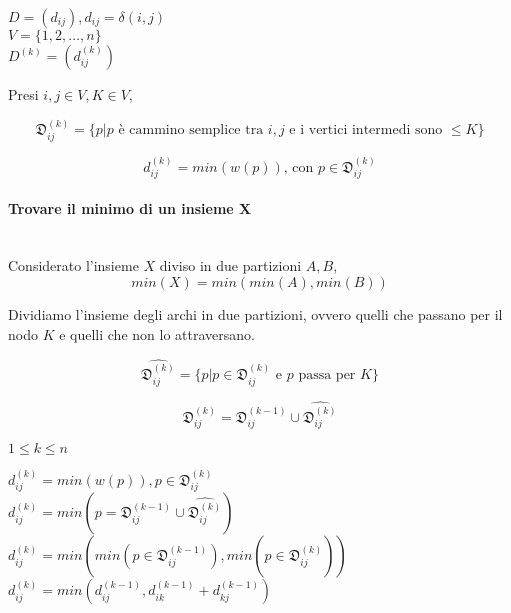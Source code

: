 $D=(d_{ij}), d_{ij} = \delta(i,j)$ \\
$V=\{1,2,\ldots,n\}$ \\
$D^{(k)} = (d_{ij}^{(k)})$


Presi $i,j \in V, K \in V$,

\begin{equation}
\mathfrak{D}_{ij}^{(k)} = \{p | p \mbox{ è cammino semplice tra } i,j \mbox{ e i vertici intermedi sono }\leq K \}
\end{equation}

\begin{equation}
d_{ij}^{(k)} = min(w(p))\mbox{, con }p \in \mathfrak{D}_{ij}^{(k)}
\end{equation}

\begin{framed}
\paragraph{Trovare il minimo di un insieme X} \\
Considerato l'insieme $X$ diviso in due partizioni $A,B$,
\begin{equation}
min(X) = min(min(A),min(B))
\end{equation}
\end{framed}


Dividiamo l'insieme degli archi in due partizioni, ovvero quelli che passano per il nodo $K$ e quelli che non lo attraversano.

\begin{equation}
\hat{\mathfrak{D}_{ij}^{(k)}} = \{p | p \in \mathfrak{D}_{ij}^{(k)} \mbox{ e } p \mbox{ passa per } K \}
\end{equation}

\begin{equation}
\mathfrak{D}_{ij}^{(k)} = \mathfrak{D}_{ij}^{(k-1)} \cup \hat{\mathfrak{D}_{ij}^{(k)}}
\end{equation}

$1 \leq k \leq n$

$d_{ij}^{(k)} = min(w(p)), p \in \mathfrak{D}_{ij}^{(k)}$ \\
$d_{ij}^{(k)} = min(p=\mathfrak{D}_{ij}^{(k-1)} \cup \hat{\mathfrak{D}_{ij}^{(k)}} )$ \\
$d_{ij}^{(k)} = min(min(p \in \mathfrak{D}_{ij}^{(k-1)}), min(p \in \hat{\mathfrak{D}_{ij}^{(k)}} ))$ \\


$d_{ij}^{(k)} = min(d_{ij}^{(k-1)}, d_{ik}^{(k-1)} + d_{kj}^{(k-1)} )$ \\



